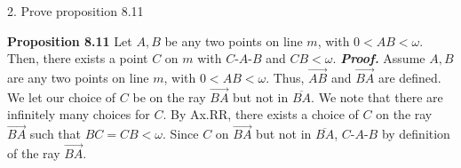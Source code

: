 \documentclass{report}
\begin{document}
    \bigbreak \noindent 
    \begin{mdframed}
        2. Prove proposition 8.11
    \end{mdframed}
    \bigbreak \noindent 
    \textbf{Proposition 8.11} Let $A,B$ be any two points on line $m$, with $0 < AB <\omega$. Then, there exists a point $C$ on $m$ with $ C\text{-}A\text{-}B$ and $ CB < \omega$.
    \bigbreak \noindent 
    \textbf{\textit{Proof.}} Assume $A,B$ are any two points on line $m$, with $0 < AB < \omega$. Thus, $\overrightarrow{AB}$ and $\overrightarrow{BA}$ are defined. We let our choice of $C$ be on the ray $\overrightarrow{BA}$ but not in $\overline{BA}$. We note that there are infinitely many choices for $C$. By Ax.RR, there exists a choice of $C$ on the ray $\overrightarrow{BA}$ such that $BC = CB < \omega$.
    \bigbreak \noindent 
    Since $C$ on $\overrightarrow{BA}$ but not in $\overline{BA}$, $ C\text{-}A\text{-}B$ by definition of the ray $\overrightarrow{BA}$. \endpf
    \bigbreak \noindent 
\end{document}
